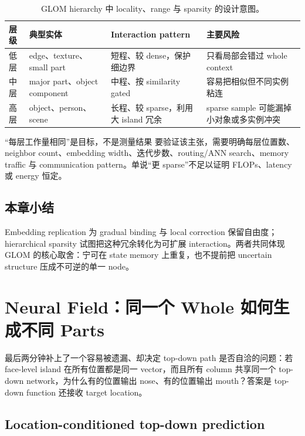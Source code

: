 \documentclass[a4paper]{article}
\begin{document}
\begin{table}[H]
\centering
\small
\caption{GLOM hierarchy 中 locality、range 与 sparsity 的设计意图。}
\begin{tabularx}{\textwidth}{L{0.17\textwidth}L{0.24\textwidth}L{0.24\textwidth}>{\raggedright\arraybackslash}X}
\toprule
层级 & 典型实体 & Interaction pattern & 主要风险 \\
\midrule
低层 & edge、texture、small part & 短程、较 dense，保护细边界 & 只看局部会错过 whole context \\
中层 & major part、object component & 中程、按 similarity gated & 容易把相似但不同实例粘连 \\
高层 & object、person、scene & 长程、较 sparse，利用大 island 冗余 & sparse sample 可能漏掉小对象或多实例冲突 \\
\bottomrule
\end{tabularx}
\end{table}

\begin{warningbox}{“每层工作量相同”是目标，不是测量结果}
要验证该主张，需要明确每层位置数、neighbor count、embedding width、迭代步数、routing/ANN search、memory traffic 与 communication pattern。单说“更 sparse”不足以证明 FLOPs、latency 或 energy 恒定。
\end{warningbox}

\subsection{本章小结}

Embedding replication 为 gradual binding 与 local correction 保留自由度；hierarchical sparsity 试图把这种冗余转化为可扩展 interaction。两者共同体现 GLOM 的核心取舍：宁可在 state memory 上重复，也不提前把 uncertain structure 压成不可逆的单一 node。

\section{Neural Field：同一个 Whole 如何生成不同 Parts}

最后两分钟补上了一个容易被遗漏、却决定 top-down path 是否自洽的问题：若 face-level island 在所有位置都是同一 vector，而且所有 column 共享同一个 top-down network，为什么有的位置输出 nose、有的位置输出 mouth？答案是 top-down function 还接收 target location。

\subsection{Location-conditioned top-down prediction}
\end{document}
